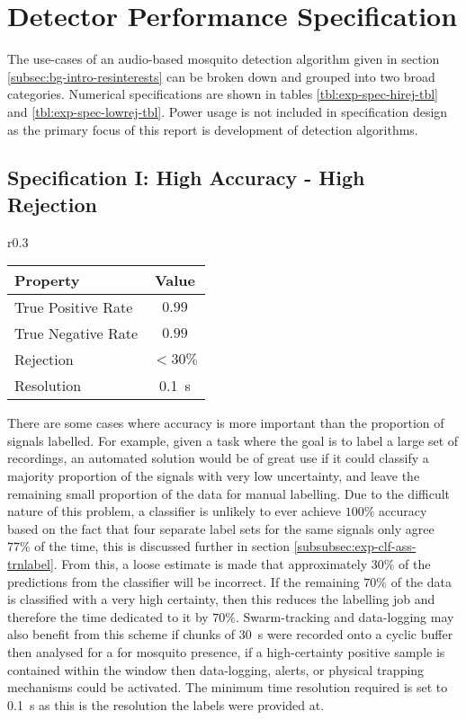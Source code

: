 \section{Detector Performance Specification}
\label{sec:exp-spec}
    The use-cases of an audio-based mosquito detection algorithm given in section \ref{subsec:bg-intro-resinterests} can be broken down and grouped into two broad categories. Numerical specifications are shown in tables \ref{tbl:exp-spec-hirej-tbl} and \ref{tbl:exp-spec-lowrej-tbl}. Power usage is not included in specification design as the primary focus of this report is development of detection algorithms. 
    \subsection{Specification I: High Accuracy - High Rejection}
    \label{subsec:exp-spec-hirej}
        \begin{wraptable}{r}{0.3\textwidth}
            \scriptsize
            \singlespacing
            \centering
                \begin{tabular}{ |l||c| } 
                    \hline
                    Property & Value \\ 
                    \hline
                    \hline
                    True Positive Rate & $0.99$ \\
                    True Negative Rate & $0.99$ \\
                    Rejection & $<30\%$\\
                    Resolution & \SI{0.1}{\second}\\
                    \hline
                \end{tabular}
            \caption{High accuracy - high rejection specifications.}
            \label{tbl:exp-spec-hirej-tbl}
        \end{wraptable}
        There are some cases where accuracy is more important than the proportion of signals labelled. For example, given a task where the goal is to label a large set of recordings, an automated solution would be of great use if it could classify a majority proportion of the signals with very low uncertainty, and leave the remaining small proportion of the data for manual labelling. Due to the difficult nature of this problem, a classifier is unlikely to ever achieve $100\%$ accuracy based on the fact that four separate label sets for the same signals only agree $77\%$ of the time, this is discussed further in section \ref{subsubsec:exp-clf-ass-trnlabel}. From this, a loose estimate is made that approximately $30\%$ of the predictions from the classifier will be incorrect. If the remaining $70\%$ of the data is classified with a very high certainty, then this reduces the labelling job and therefore the time dedicated to it by $70\%$. Swarm-tracking and data-logging may also benefit from this scheme if chunks of \SI{30}{\second} were recorded onto a cyclic buffer then analysed for a for mosquito presence, if a high-certainty positive sample is contained within the window then data-logging, alerts, or physical trapping mechanisms could be activated. The minimum time resolution required is set to \SI{0.1}{\second} as this is the resolution the labels were provided at.  
        
